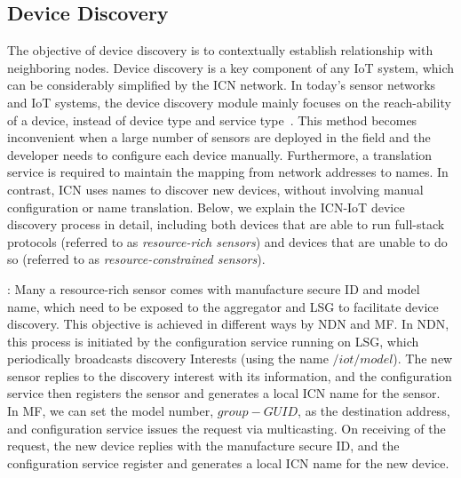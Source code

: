 \subsection{Device Discovery}
The objective of device discovery is to contextually establish relationship with neighboring nodes. Device discovery is a key component of any IoT system, which can be considerably simplified by the ICN network. In today's sensor networks and IoT systems, the device discovery module mainly focuses on the reach-ability of a device, instead of device type and service type~\cite{***}. This method becomes inconvenient when a large number of sensors are deployed in the field and the developer needs to configure each device manually. Furthermore, a translation service is required to maintain the mapping from network addresses to names. In contrast, ICN uses names to discover new devices, without involving manual configuration or name translation. Below, we explain the ICN-IoT device discovery process in detail, including both devices that are able to run  full-stack protocols (referred to as \emph{resource-rich sensors}) and devices that are unable to do so (referred to as \emph{resource-constrained sensors}).

\vspace{1mm}: Many a resource-rich sensor comes with manufacture secure ID and model name, which need to be exposed to the aggregator and LSG to facilitate device discovery. This objective is achieved in different ways by NDN and MF.  In NDN, this process is initiated by the configuration service running on LSG, which periodically broadcasts discovery Interests (using the name $/iot/model$). The new sensor replies to the discovery interest with its information, and the configuration service then registers the sensor and generates a local ICN name for the sensor. In MF, we can set the model number, $group-GUID$, as the destination address, and configuration service issues the request via multicasting. On receiving of the request, the new device replies with the manufacture secure ID, and the configuration service register and generates a local ICN name for the new device.


